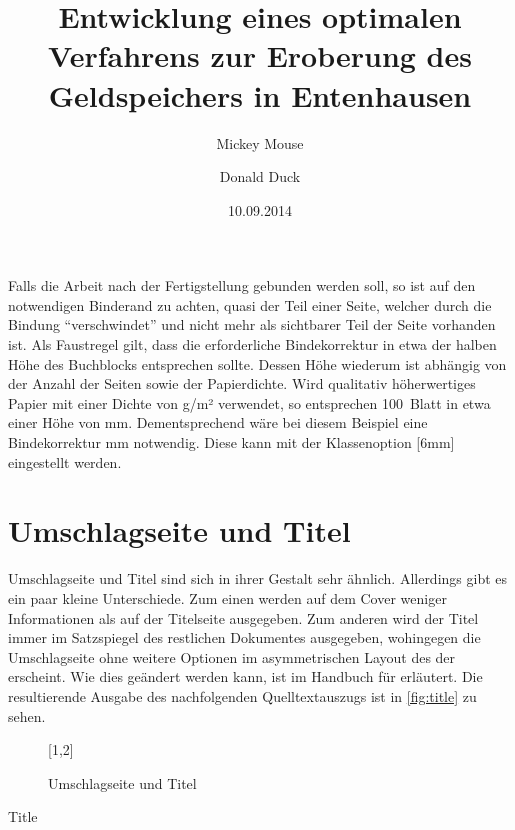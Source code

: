 \documentclass[english,ngerman]{tudscrartcl}
\begin{document}
Falls die Arbeit nach der Fertigstellung gebunden werden soll, so ist auf den 
notwendigen Binderand zu achten, quasi der Teil einer Seite, welcher durch die 
Bindung \enquote{verschwindet} und nicht mehr als sichtbarer Teil der Seite 
vorhanden ist. Als Faustregel gilt, dass die erforderliche Bindekorrektur in 
etwa der halben Höhe des Buchblocks entsprechen sollte. Dessen Höhe wiederum 
ist abhängig von der Anzahl der Seiten sowie der Papierdichte. Wird qualitativ 
höherwertiges Papier mit einer Dichte von \unit[100]{g/m²} verwendet, so 
entsprechen 100~Blatt in etwa einer Höhe von \unit[12]{mm}. Dementsprechend 
wäre bei diesem Beispiel eine Bindekorrektur \unit[6]{mm} notwendig. Diese 
kann mit der Klassenoption [6mm] eingestellt werden.



\section{Umschlagseite und Titel}
Umschlagseite und Titel sind sich in ihrer Gestalt sehr ähnlich. Allerdings 
gibt es ein paar kleine Unterschiede. Zum einen werden auf dem Cover weniger 
Informationen als auf der Titelseite ausgegeben. Zum anderen wird der Titel 
immer im Satzspiegel des restlichen Dokumentes ausgegeben, wohingegen die 
Umschlagseite ohne weitere Optionen im asymmetrischen Layout des \CDs der \TnUD 
erscheint. Wie dies geändert werden kann, ist im Handbuch für  
erläutert. Die resultierende Ausgabe des nachfolgenden Quelltextauszugs ist in 
\autoref{fig:title} zu sehen.
\begin{figure}
[1,2]
\caption{Umschlagseite und Titel}
\label{fig:title}
\end{figure}
\begin{Tutorial+}{Title}
\title{%
  Entwicklung eines optimalen Verfahrens zur Eroberung des
  Geldspeichers in Entenhausen
}
\author{%
  Mickey Mouse
  \and%
  Donald Duck
}
\date{10.09.2014}
\makecover
\maketitle
\end{Tutorial+}
\end{document}
